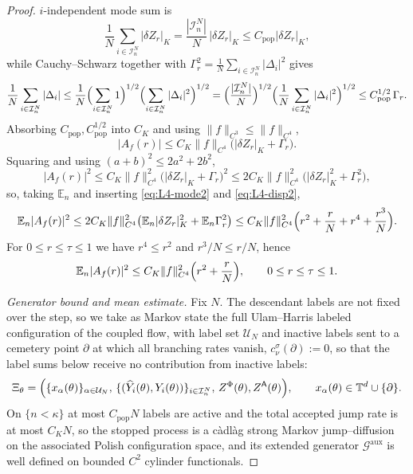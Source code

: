 \documentclass[a4paper,fleqn]{cas-sc}
\theoremstyle{definition}
\theoremstyle{remark}
\begin{document}
\begin{proof}
$i$-independent mode sum is
\[
\frac1N\sum_{i\in\mathcal I^N_n}|\delta Z_r|_K
=\frac{|\mathcal I^N_n|}N\,|\delta Z_r|_K
\le C_{\mathrm{pop}}|\delta Z_r|_K,
\]
while Cauchy--Schwarz together with $\Gamma_r^2=\frac1N\sum_{i\in\mathcal I^N_n}|\Delta_i|^2$ gives
\[
\frac1N\sum_{i\in\mathcal I^N_n}|\Delta_i|
\le\frac1N\Bigl(\sum_{i\in\mathcal I^N_n}1\Bigr)^{1/2}\Bigl(\sum_{i\in\mathcal I^N_n}|\Delta_i|^2\Bigr)^{1/2}
=\Bigl(\frac{|\mathcal I^N_n|}N\Bigr)^{1/2}\Bigl(\frac1N\sum_{i\in\mathcal I^N_n}|\Delta_i|^2\Bigr)^{1/2}
\le C_{\mathrm{pop}}^{1/2}\,\Gamma_r.
\]
Absorbing $C_{\mathrm{pop}},C_{\mathrm{pop}}^{1/2}$ into $C_K$ and using $\|f\|_{C^3}\le\|f\|_{C^4}$,
\[
|A_f(r)|\le C_K\|f\|_{C^4}\bigl(|\delta Z_r|_K+\Gamma_r\bigr).
\]
Squaring and using $(a+b)^2\le2a^2+2b^2$,
\[
|A_f(r)|^2
\le C_K\|f\|_{C^4}^2\bigl(|\delta Z_r|_K+\Gamma_r\bigr)^2
\le 2C_K\|f\|_{C^4}^2\bigl(|\delta Z_r|_K^2+\Gamma_r^2\bigr),
\]
so, taking $\mathbb E_n$ and inserting \eqref{eq:L4-mode2} and \eqref{eq:L4-disp2},
\[
\mathbb E_n|A_f(r)|^2
\le 2C_K\|f\|_{C^4}^2\bigl(\mathbb E_n|\delta Z_r|_K^2+\mathbb E_n\Gamma_r^2\bigr)
\le C_K\|f\|_{C^4}^2\Bigl(r^2+\frac rN+r^4+\frac{r^3}N\Bigr).
\]
For $0\le r\le\tau\le1$ we have $r^4\le r^2$ and $r^3/N\le r/N$, hence
\begin{equation}\label{eq:L4-Af2}
\mathbb E_n|A_f(r)|^2\le C_K\|f\|_{C^4}^2\Bigl(r^2+\frac rN\Bigr),
\qquad 0\le r\le\tau\le1.
\end{equation}

\medskip
\noindent\emph{Generator bound and mean estimate.}
Fix $N$. The descendant labels are not fixed over the step, so we take as Markov state the full
Ulam--Harris labeled configuration of the coupled flow, with label set $\mathcal U_N$ and inactive
labels sent to a cemetery point $\partial$ at which all branching rates vanish, $c^\sigma_\nu(\partial):=0$,
so that the label sums below receive no contribution from inactive labels:
\[
\Xi_\theta=\Bigl(\{x_\alpha(\theta)\}_{\alpha\in\mathcal U_N},\,
\{(\widehat Y_i(\theta),Y_i(\theta))\}_{i\in\mathcal I^N_n},\,
Z^\Phi(\theta),Z^{\mathsf A}(\theta)\Bigr),\qquad x_\alpha(\theta)\in\mathbb T^d\cup\{\partial\}.
\]
On $\{n<\kappa\}$ at most $C_{\mathrm{pop}}N$ labels are active and the total
accepted jump rate is at most $C_KN$, so the stopped process is a c\`adl\`ag strong Markov
jump--diffusion on the associated Polish configuration space, and its extended generator
$\mathcal G^{\mathrm{aux}}$ is well defined on bounded $C^2$ cylinder functionals.


\end{proof}
\end{document}
